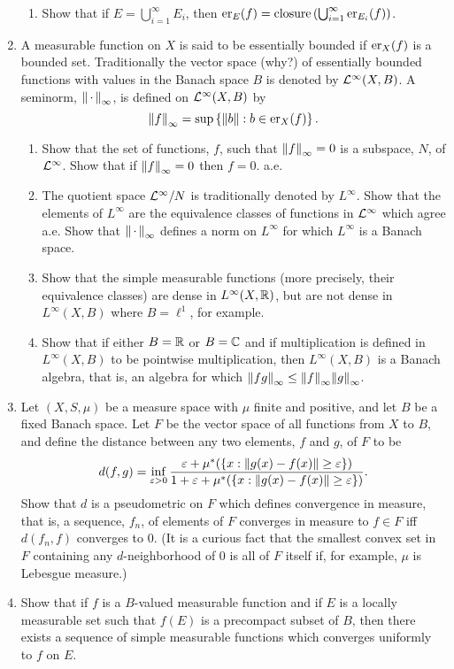 \begin{enumerate}[label=\arabic*),ref=\arabic*]
\begin{enumerate}
    \item Show that if $E=\bigcup_{i=1}^\infty E_i$, then $\er{f}{E}=\text{closure}\br{\bigcup_{i=1}^\infty\er{f}{E_i}}$.
\end{enumerate}

\item\label{exer:essentially bounded}
A measurable function on $X$ is said to be essentially bounded if $\er{f}{X}$ is a bounded set. Traditionally the vector space (why?) of essentially bounded functions with values in the Banach space $B$ is denoted by $\cL^\infty(X, B)$. A seminorm, $\norm{\imarg}_\infty$, is defined on $\cL^\infty(X, B)$ by \[\norm{f}_\infty=\sup\brc{\norm{b}: b\in\er{f}{X}}.\]
\begin{enumerate}
    \item Show that the set of functions, $f$, such that $\norm{f}_\infty=0$ is a subspace, $N$, of $\cL^\infty$. Show that if $\norm{f}_\infty=0$ then $f=0$. a.e.
    
    \item The quotient space $\cL^\infty/N$ is traditionally denoted by $L^\infty$. Show that the elements of $L^\infty$ are the equivalence classes of functions in $\cL^\infty$ which agree a.e. Show that $\norm{\imarg}_\infty$ defines a norm on $L^\infty$ for which $L^\infty$ is a Banach space.

    \item Show that the simple measurable functions (more precisely, their equivalence classes) are dense in $L^\infty(X,\bR)$, but are not dense in $L^\infty(X, B)$ where $B=\ell^1$, for example.

    \item Show that if either $B=\bR$ or $B=\bC$ and if multiplication is defined in $L^\infty(X, B)$ to be pointwise multiplication, then $L^\infty(X, B)$ is a Banach algebra, that is, an algebra for which $\norm{fg}_\infty\leq\norm{f}_\infty\norm{g}_\infty$.
\end{enumerate}

\item Let $(X, S, \mu)$ be a measure space with $\mu$ finite and positive, and let $B$ be a fixed Banach space. Let $F$ be the vector space of all functions from $X$ to $B$, and define the distance between any two elements, $f$ and $g$, of $F$ to be \[d(f,g)=\inf_{\ep>0}\frac{\ep+\mu^*(\brc{x:\norm{g(x)-f(x)}\geq\ep})}{1+\ep+\mu^*(\brc{x:\norm{g(x)-f(x)}\geq\ep})}.\]
Show that $d$ is a pseudometric on $F$ which defines convergence in measure, that is, a sequence, $f_n$, of elements of $F$ converges in measure to $f\in F$ iff $d(f_n, f)$ converges to 0. (It is a curious fact that the smallest convex set in $F$ containing any $d$-neighborhood of 0 is all of $F$ itself if, for example, $\mu$ is Lebesgue measure.)

\item\label{exer:precpct range seq of simple func}
Show that if $f$ is a $B$-valued measurable function and if $E$ is a locally measurable set such that $f(E)$ is a precompact subset of $B$, then there exists a sequence of simple measurable functions which converges uniformly to $f$ on $E$.
\end{enumerate}